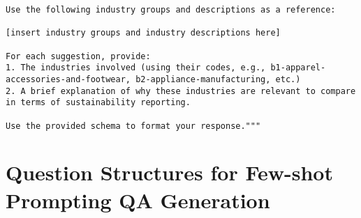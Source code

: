 \begin{appendices}
\begin{lstlisting}
Use the following industry groups and descriptions as a reference:

[insert industry groups and industry descriptions here]

For each suggestion, provide:
1. The industries involved (using their codes, e.g., b1-apparel-accessories-and-footwear, b2-appliance-manufacturing, etc.)
2. A brief explanation of why these industries are relevant to compare in terms of sustainability reporting.

Use the provided schema to format your response."""
\end{lstlisting}

\section{Question Structures for Few-shot Prompting QA Generation}


\end{appendices}
